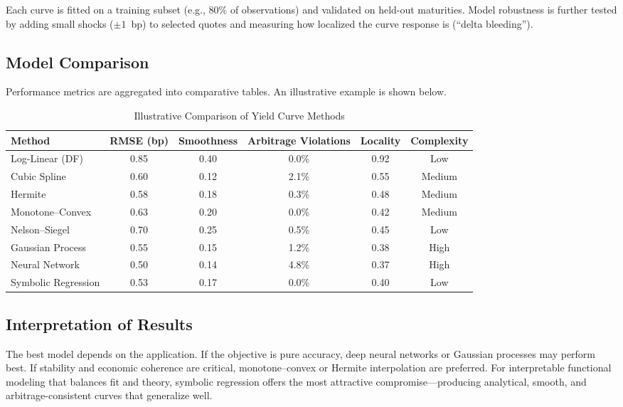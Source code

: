 \documentclass[12pt]{report}
\begin{document}
Each curve is fitted on a training subset (e.g., 80\% of observations) and validated on held-out maturities.  
Model robustness is further tested by adding small shocks (\(\pm1\)~bp) to selected quotes and measuring how localized the curve response is (“delta bleeding”).

\subsection{Model Comparison}

Performance metrics are aggregated into comparative tables.  
An illustrative example is shown below.

\begin{table}[h!]
\centering
\caption{Illustrative Comparison of Yield Curve Methods}
\begin{tabularx}{\textwidth}{lccccc}
\toprule
Method & RMSE (bp) & Smoothness & Arbitrage Violations & Locality & Complexity \\
\midrule
Log-Linear (DF) & 0.85 & 0.40 & 0.0\% & 0.92 & Low \\
Cubic Spline & 0.60 & 0.12 & 2.1\% & 0.55 & Medium \\
Hermite & 0.58 & 0.18 & 0.3\% & 0.48 & Medium \\
Monotone–Convex & 0.63 & 0.20 & 0.0\% & 0.42 & Medium \\
Nelson–Siegel & 0.70 & 0.25 & 0.5\% & 0.45 & Low \\
Gaussian Process & 0.55 & 0.15 & 1.2\% & 0.38 & High \\
Neural Network & 0.50 & 0.14 & 4.8\% & 0.37 & High \\
Symbolic Regression & 0.53 & 0.17 & 0.0\% & 0.40 & Low \\
\bottomrule
\end{tabularx}
\end{table}

\subsection{Interpretation of Results}

The best model depends on the application.  
If the objective is pure accuracy, deep neural networks or Gaussian processes may perform best.  
If stability and economic coherence are critical, monotone–convex or Hermite interpolation are preferred.  
For interpretable functional modeling that balances fit and theory, symbolic regression offers the most attractive compromise—producing analytical, smooth, and arbitrage-consistent curves that generalize well.
\end{document}
